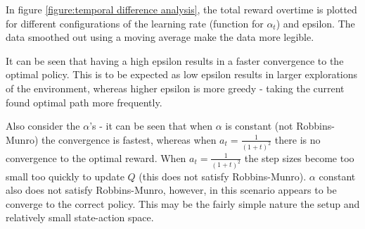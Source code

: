 In figure \ref{figure:temporal difference analysis}, the total reward
overtime is plotted for different configurations of the learning rate
(function for $\alpha_t$) and epsilon. The data smoothed out 
using a moving average make the data more legible.

It can be seen that having a high epsilon results in a faster 
convergence to the optimal policy. This is to be expected as 
low epsilon results in larger explorations of the environment,
whereas higher epsilon is more greedy - taking the current found 
optimal path more frequently. 

Also consider the $\alpha$'s - it can be seen that when $\alpha$ is
constant (not Robbins-Munro) the convergence is fastest, whereas
when $a_t =\frac{1}{(1 + t)^2}$ there is no convergence to the 
optimal reward. When $a_t =\frac{1}{(1 + t)^2}$ the step sizes
become too small too quickly to update $Q$ (this does not 
satisfy Robbins-Munro). $\alpha$ constant also does not satisfy 
Robbins-Munro, however, in this scenario appears to be converge
to the correct policy. This may be the fairly simple nature the setup
and relatively small state-action space.
